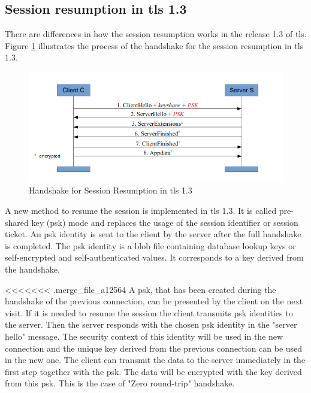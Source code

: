 \subsection{Session resumption in \gls{tls} 1.3}
\label{subsec:resumption1_3}

There are differences in how the session resumption works in the release 1.3 of \gls{tls}. Figure \ref{fig:resumption1_3} illustrates the process of the handshake for the session resumption in \gls{tls} 1.3.

\begin{figure}[H]
	\centering
		\includegraphics[scale=0.8]{images/resumption1_3.png}
	\caption{Handshake for Session Resumption in \gls{tls} 1.3 \cite{Hassenstein}}
	\label{fig:resumption1_3}
\end{figure}

A new method to resume the session is implemented in \gls{tls} 1.3. It is called pre-shared key (\gls{psk}) mode and replaces the usage of the session identifier or session ticket. An \gls{psk} identity is sent to the client by the server after the full handshake is completed. The \gls{psk} identity is a blob file containing database lookup keys or self-encrypted and self-authenticated values. It corresponds to a key derived from the handshake.

<<<<<<< .merge_file_a12564
A \gls{psk}, that has been created during the handshake of the previous connection, can be presented by the client on the next visit. If it is needed to resume the session the client transmits \gls{psk} identities to the server. Then the server responds with the chosen \gls{psk} identity in the "server hello" message. The security context of this identity will be used in the new connection and the unique key derived from the previous connection can be used in the new one. 
The client can transmit the data to the server immediately in the first step together with the \gls{psk}. The data will be encrypted with the key derived from this \gls{psk}. \cite{ldapwiki:resumption} This is the case of "Zero round-trip" handshake.

